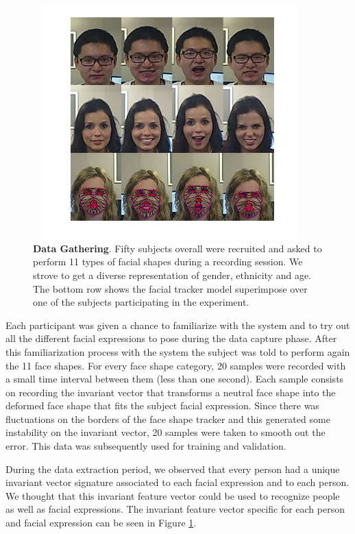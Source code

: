 \documentclass[]{article}
\begin{document}
\begin{figure}[ht]
\begin{center}
\vspace{-3mm}
\includegraphics[width=0.95\textwidth,height=90mm]{figures/dataExtrationExamples.jpg}
\end{center}
\caption{\textbf{Data Gathering}. Fifty subjects overall were recruited  and asked to perform 11 types of facial shapes during a 
recording session. We strove to  get a diverse representation of gender, ethnicity and age. The bottom row shows the facial tracker 
model superimpose over one of the subjects participating in the experiment.}
\label{comparationBetweenFaces}
\end{figure}


Each participant was given a chance to familiarize with the system and to try out all the different facial expressions
to pose during the data capture phase. After this familiarization process with the system the subject was told to
perform again the 11 face shapes. For every face shape category, 20 samples were recorded with a small time
interval between them (less than one second). Each sample consists on recording the invariant vector that transforms a neutral
face shape into the deformed face shape that fits the subject facial expression. Since there was fluctuations on the
borders of the face shape tracker and this generated some instability on the invariant vector, 20 samples were taken to
smooth out the error. This data was subsequently used for training and validation.


During the data extraction period, we observed that every person had a unique invariant vector signature associated 
to each facial expression and to each person. We thought that this invariant feature vector could be
used to recognize people as well as facial expressions. The invariant feature vector specific for each person and
facial expression can be seen in Figure \ref{comparationBetweenFaces}.
\end{document}
